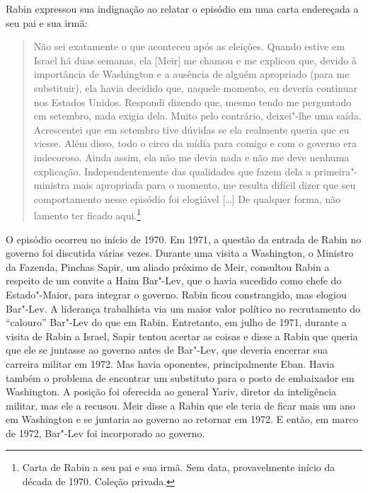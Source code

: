 Rabin expressou sua indignação ao relatar o episódio em uma carta
endereçada a seu pai e sua irmã:

\begin{quote}
Não sei exatamente o que aconteceu após as eleições. Quando estive em
Israel há duas semanas, ela {[}Meir{]} me chamou e me explicou que, devido à
importância de Washington e a ausência de alguém apropriado (para
me substituir), ela havia decidido que, naquele momento, eu deveria
continuar nos Estados Unidos. Respondi dizendo que, mesmo tendo me
perguntado em setembro, nada exigia dela. Muito pelo contrário,
deixei"-lhe uma saída. Acrescentei que em setembro tive dúvidas se ela
realmente queria que eu viesse. Além disso, todo o circo da mídia para comigo e
com o governo era indecoroso. Ainda assim, ela não me devia nada e não
me deve nenhuma explicação. Independentemente das qualidades que fazem
dela a primeira"-ministra mais apropriada para o momento, me resulta
difícil dizer que seu comportamento nesse episódio foi elogiável {[}\ldots{}{]} De
qualquer forma, não lamento ter ficado aqui.\footnote{Carta de Rabin a seu pai e sua irmã. Sem data, provavelmente início da década de 1970. Coleção privada.}
\end{quote}

O episódio ocorreu no início de 1970. Em 1971, a questão da entrada de
Rabin no governo foi discutida várias vezes. Durante uma visita a
Washington, o Ministro da Fazenda, Pinchas Sapir, um aliado próximo de
Meir, consultou Rabin a respeito de um convite a Haim Bar"-Lev, que o
havia sucedido como chefe do Estado"-Maior, para integrar o governo.
Rabin ficou constrangido, mas elogiou Bar"-Lev. A liderança trabalhista
via um maior valor político no recrutamento do ``calouro'' Bar"-Lev do que
em Rabin. Entretanto, em julho de 1971, durante a visita de Rabin a
Israel, Sapir tentou acertar as coisas e disse a Rabin que queria que
ele se juntasse ao governo antes de Bar"-Lev, que deveria encerrar sua
carreira militar em 1972. Mas havia oponentes, principalmente Eban.
Havia também o problema de encontrar um substituto para o posto de
embaixador em Washington. A posição foi oferecida ao general Yariv,
diretor da inteligência militar, mas ele a recusou. Meir disse a Rabin
que ele teria de ficar mais um ano em Washington e se juntaria ao
governo ao retornar em 1972. E então, em marco de 1972, Bar"-Lev foi
incorporado ao governo.



